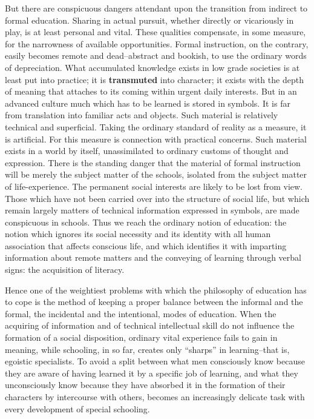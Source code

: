 \begin{linenumbers}
\indent But there are conspicuous dangers attendant upon the transition from indirect to formal education. Sharing in actual pursuit, whether directly or vicariously in play, is at least personal and vital. These qualities compensate, in some measure, for the narrowness of available opportunities. Formal instruction, on the contrary, easily becomes remote and dead--abstract and bookish, to use the ordinary words of depreciation. What accumulated knowledge exists in low grade societies is at least put into practice; it is \textbf{transmuted} into character; it exists with the depth of meaning that attaches to its coming within urgent daily interests.
But in an advanced culture much which has to be learned is stored in symbols. It is far from translation into familiar acts and objects. Such material is relatively technical and superficial. Taking the ordinary standard of reality as a measure, it is artificial. For this measure is connection with practical concerns. Such material exists in a world by itself, unassimilated to ordinary customs of thought and expression. There is the standing danger that the material of formal instruction will be merely the subject matter of the schools, isolated from the subject matter of life-experience. The permanent social interests are likely to be lost from view. Those which have not been carried over into the structure of social life, but which remain largely matters of technical information expressed in symbols, are made conspicuous in schools. Thus we reach the ordinary notion of education: the notion which ignores its social necessity and its identity with all human association that affects conscious life, and which identifies it with imparting information about remote matters and the conveying of learning through verbal signs: the acquisition of literacy.

\indent Hence one of the weightiest problems with which the philosophy of education has to cope is the method of keeping a proper balance between the informal and the formal, the incidental and the intentional, modes of education. When the acquiring of information and of technical intellectual skill do not influence the formation of a social disposition, ordinary vital experience fails to gain in meaning, while schooling, in so far, creates only ``sharps'' in learning--that is, egoistic specialists. To avoid a split between what men consciously know because they are aware of having learned it by a specific job of learning, and what they unconsciously know because they have absorbed it in the formation of their characters by intercourse with others, becomes an increasingly delicate task with every development of special schooling.
\end{linenumbers}

